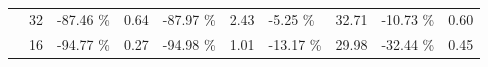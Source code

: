 \begin{table}[]
\begin{tabular}{|c|c|lr|lr|lr|lr|}
                                 & 32                                                           & {\color[HTML]{656565} -87.46 \%}                 & 0.64                                     & {\color[HTML]{656565} -87.97 \%}               & 2.43  & {\color[HTML]{656565} -5.25 \%}  & 32.71 & {\color[HTML]{656565} -10.73 \%} & 0.60 \\ \cline{2-10} 
                                 & 16                                                           & {\color[HTML]{656565} -94.77 \%}                 & 0.27                                     & {\color[HTML]{656565} -94.98 \%}               & 1.01  & {\color[HTML]{656565} -13.17 \%} & 29.98 & {\color[HTML]{656565} -32.44 \%} & 0.45 \\ \hline
    \end{tabular}
    \caption{}
    \label{tab_size}
\end{table}

